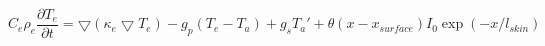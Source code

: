 \documentclass[12pt]{article}
\begin{document}
$$ 
  C_e \rho_e \frac{\partial T_e}{\partial t} = 
  \bigtriangledown (\kappa_e \bigtriangledown T_e) - 
  g_p (T_e - T_a) + g_s T_a' + \theta (x-x_{surface})I_0 \exp(-x/l_{skin})
$$
\end{document}
